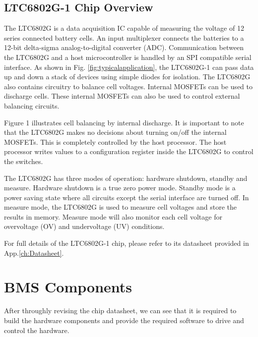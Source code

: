 \documentclass[%
DIV=12,
abstract=on
12pt,			%
]
{scrartcl} %
\begin{document}
\subsection{LTC6802G-1 Chip Overview}
The LTC6802G is a data acquisition IC capable of measuring the voltage of 12 series connected battery cells.
An input multiplexer connects the batteries to a 12-bit delta-sigma analog-to-digital converter (ADC). 
Communication between the LTC6802G and a host microcontroller is handled by an SPI compatible serial interface. 
As shown in Fig. \ref{fig:typicalapplication}, the LTC6802G-1 can pass data up and down a stack of devices using simple diodes for
isolation.  The LTC6802G also contains circuitry to balance cell voltages. Internal MOSFETs can be used to discharge cells. These internal MOSFETs can also be used to control external balancing circuits. 

Figure 1 illustrates cell balancing by internal discharge. It is important to note that the LTC6802G makes no decisions about turning on/off the internal MOSFETs. This is completely controlled by the host processor. The host processor writes values to a configuration register inside the LTC6802G to control the switches. 

The LTC6802G has three modes of operation: hardware shutdown, standby and measure. Hardware shutdown is
a true zero power mode. Standby mode is a power saving state where all circuits except the serial interface are turned off. In measure mode, the LTC6802G is used to measure cell voltages and store the results in memory. Measure mode will also monitor each cell voltage for overvoltage (OV) and undervoltage (UV) conditions.

\vspace{0.3cm}%
\noindent\colorbox{myLavender!15}{\parbox{\textwidth}{\vspace{0.1cm}%
    For full details of the  LTC6802G-1 chip, please refer to  its datasheet provided in App.\ref{ch:Datasheet}.%
    \vspace{0.1cm}}}
 
\section{BMS Components}
After throughly revising the chip datasheet, we can see that it is required to build the hardware components and provide the required software to drive and control the hardware.
\end{document}

